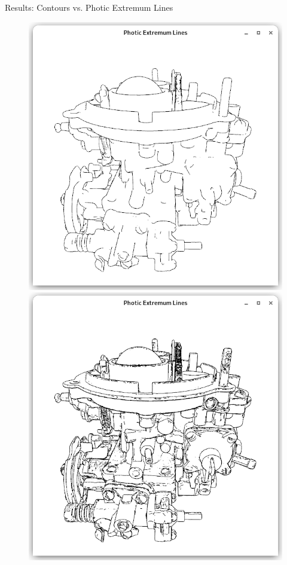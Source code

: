 \documentclass[aspectratio=169]{beamer}
\begin{document}
  \begin{frame}{Results: Contours vs. Photic Extremum Lines}
    \begin{figure}
      \center
      \includegraphics[height=0.49\textheight,trim={15px 15 15 50},clip]{images/tile-contour-shader.png}
      \hspace{5em}
      \includegraphics[height=0.49\textheight,trim={15px 15 15 50},clip]{images/tile-contour-pel-shader.png}

\end{figure}
\end{frame}
\end{document}
